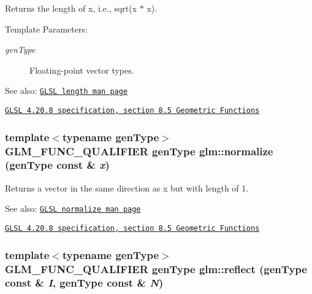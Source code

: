 Returns the length of x, i.e., sqrt(x $\ast$ x).

\begin{Desc}
\item[Template Parameters:]
\begin{description}
\item[{\em genType}]Floating-point vector types.\end{description}
\end{Desc}
\begin{Desc}
\item[See also:]\href{http://www.opengl.org/sdk/docs/manglsl/xhtml/length.xml}{\tt GLSL length man page} 

\href{http://www.opengl.org/registry/doc/GLSLangSpec.4.20.8.pdf}{\tt GLSL 4.20.8 specification, section 8.5 Geometric Functions} \end{Desc}
\hypertarget{group__core__func__geometric_g0feb2bb89ee2743677ad2cb84544bd83}{
\subsubsection[normalize]{\setlength{\rightskip}{0pt plus 5cm}template$<$typename genType$>$ GLM\_\-FUNC\_\-QUALIFIER genType glm::normalize (genType const \& {\em x})}}
\label{group__core__func__geometric_g0feb2bb89ee2743677ad2cb84544bd83}


Returns a vector in the same direction as x but with length of 1.

\begin{Desc}
\item[See also:]\href{http://www.opengl.org/sdk/docs/manglsl/xhtml/normalize.xml}{\tt GLSL normalize man page} 

\href{http://www.opengl.org/registry/doc/GLSLangSpec.4.20.8.pdf}{\tt GLSL 4.20.8 specification, section 8.5 Geometric Functions} \end{Desc}
\hypertarget{group__core__func__geometric_gc973ce2bc49f749a469d3ed2e2ac5a54}{
\subsubsection[reflect]{\setlength{\rightskip}{0pt plus 5cm}template$<$typename genType$>$ GLM\_\-FUNC\_\-QUALIFIER genType glm::reflect (genType const \& {\em I}, \/  genType const \& {\em N})}}
\label{group__core__func__geometric_gc973ce2bc49f749a469d3ed2e2ac5a54}


